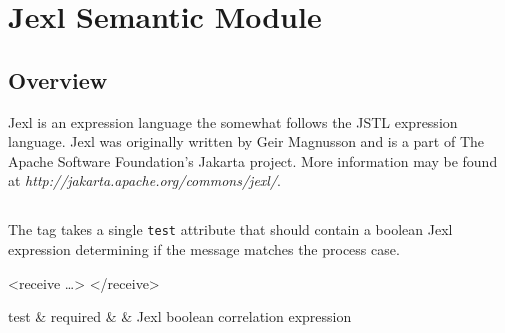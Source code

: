 \chapter{Jexl Semantic Module}

\section{Overview}

Jexl is an expression language the somewhat follows the JSTL
expression language.  Jexl was originally written by Geir
Magnusson and is a part of The Apache Software Foundation's 
Jakarta project.  More information may be found at
\emph{http://jakarta.apache.org/commons/jexl/}.

\section{}

The  tag takes a single \verb|test| attribute
that should contain a boolean Jexl expression determining if
the message matches the process case.

\begin{codelisting}
<receive \dots>
</receive>
\end{codelisting}

\begin{attrDefs}
test		&	required	&			& Jexl boolean correlation expression \\
\end{attrDefs}
